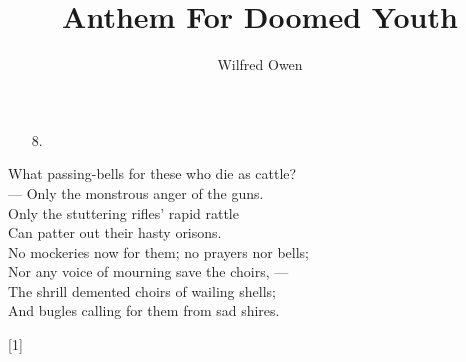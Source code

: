 \documentclass{article}
\title{Anthem For Doomed Youth}
\author{Wilfred Owen}
\date{}
\begin{document}
\maketitle

\fancyhf{}
\renewcommand{\headrulewidth}{0pt}
\thispagestyle{fancy}

\hrulefill
\bigskip

\doublespacing

\flushright

\begin{multicols}{2}

    \begin{minipage}{1cm}
        \begin{enumerate}[itemsep=1.2ex]
            \item[]
            \item[] 
            \item[] 
            \item[] 
            \item[] 
            \item[8.]
        \end{enumerate}
    \end{minipage}

    \begin{minipage}{8cm}
            What passing-bells for these who die as cattle?\\
                --- Only the monstrous anger of the guns.\\
            Only the stuttering rifles' rapid rattle\\
            Can patter out their hasty orisons.\\
            No mockeries now for them; no prayers nor bells;\\
            Nor any voice of mourning save the choirs, --- \\
            The shrill demented choirs of wailing shells;\\
            And bugles calling for them from sad shires.\\

            \begin{center}[1]\end{center}
    \end{minipage}

\end{multicols}
\end{document}
